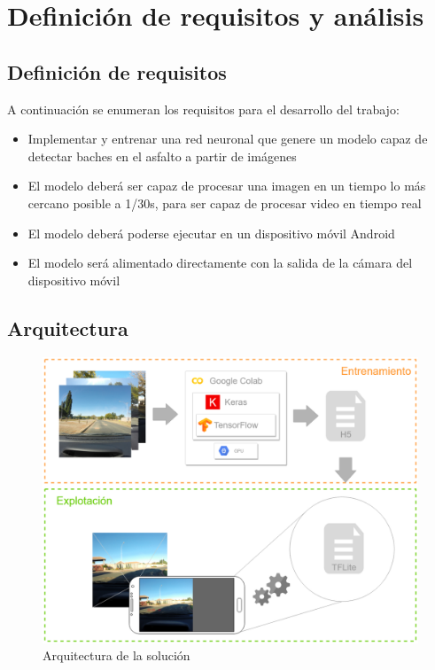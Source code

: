 \section{Definición de requisitos y análisis}
\label{sec:definicion_de_requisitos_y_analisis}

\subsection{Definición de requisitos}


A continuación se enumeran los requisitos para el desarrollo del trabajo:

\begin{itemize}
	\item Implementar y entrenar una red neuronal que genere un modelo capaz de detectar baches en el asfalto a partir de imágenes
	\item El modelo deberá ser capaz de procesar una imagen en un tiempo lo más cercano posible a 1/30s, para ser capaz de procesar video en tiempo real
	\item El modelo deberá poderse ejecutar en un dispositivo móvil Android
	\item El modelo será alimentado directamente con la salida de la cámara del dispositivo móvil
\end{itemize}

\subsection{Arquitectura}


\begin{figure}[H]
	\centering
	\includegraphics[width=\linewidth]{images/architecture.png}
	\caption{Arquitectura de la solución}
	\label{fig:architecture}
\end{figure}

